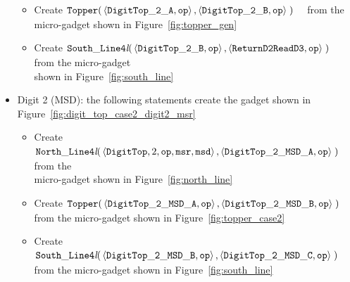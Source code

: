 \begin{itemize}
\begin{itemize}
            \item Create
            $\begin{aligned}[t]
                {\tt Topper}(& \left \langle {\tt DigitTop\_2\_A}, {\tt op} \right\rangle,
                               \left \langle {\tt DigitTop\_2\_B}, {\tt op} \right\rangle \;)
            \end{aligned}$ from the micro-gadget shown in Figure~\ref{fig:topper_gen}

            \item Create
            $\begin{aligned}[t]
                {\tt South\_Line4\textit{l}}(& \left\langle {\tt DigitTop\_2\_B}, {\tt op} \right\rangle,
                                               \left\langle {\tt ReturnD2ReadD3}, {\tt op} \right\rangle \;)
            \end{aligned}$ from the micro-gadget\\shown in Figure~\ref{fig:south_line}
        \end{itemize}
        \vspace{1cm}


        \item Digit 2 (MSD): the following statements create the gadget shown in Figure~\ref{fig:digit_top_case2_digit2_msr}
        \begin{itemize}
            \item Create
            $\begin{aligned}[t]
                {\tt North\_Line4\textit{l}}(& \left\langle {\tt DigitTop}, 2,          {\tt op}, {\tt msr}, {\tt msd} \right\rangle,
                                               \left\langle {\tt DigitTop\_2\_MSD\_A},  {\tt op}                       \right\rangle \;)
            \end{aligned}$ from the\\micro-gadget shown in Figure~\ref{fig:north_line}

            \item Create
            $\begin{aligned}[t]
                {\tt Topper}(& \left\langle {\tt DigitTop\_2\_MSD\_A}, {\tt op} \right\rangle,
                               \left\langle {\tt DigitTop\_2\_MSD\_B}, {\tt op} \right\rangle \;)
            \end{aligned}$ from the micro-gadget shown in Figure~\ref{fig:topper_case2}

            \item Create
            $\begin{aligned}[t]
                {\tt South\_Line4\textit{l}}(& \left\langle {\tt DigitTop\_2\_MSD\_B}, {\tt op} \right\rangle,
                                               \left\langle {\tt DigitTop\_2\_MSD\_C}, {\tt op} \right\rangle \;)
            \end{aligned}$ from the micro-gadget shown in Figure~\ref{fig:south_line}


\end{itemize}
\end{itemize}
